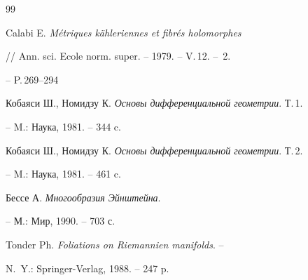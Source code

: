 \begin{thebibliography}{99}







Calabi E. {\em M\'etriques k\" ahleriennes et fibr\'es holomorphes}


// Ann. sci. Ecole norm. super. -- 1979. -- V.\,12. -- \No\,2.


-- P.\,269--294




Кобаяси Ш., Номидзу К. {\em Основы дифференциальной геометрии}. Т.\,1.


-- M.: Наука, 1981. -- 344 c.




Кобаяси Ш., Номидзу К. {\em Основы дифференциальной геометрии}. Т.\,2.


-- M.: Наука, 1981. -- 461 c.




Бессе А. {\em Многообразия Эйнштейна}.


-- М.: Мир, 1990. -- 703 с.




Tonder Ph. {\em Foliations on Riemannien manifolds}. --


N.~Y.: Springer-Verlag, 1988. -- 247 p.





\end{thebibliography}





\vskip 2cm












\label{end}





